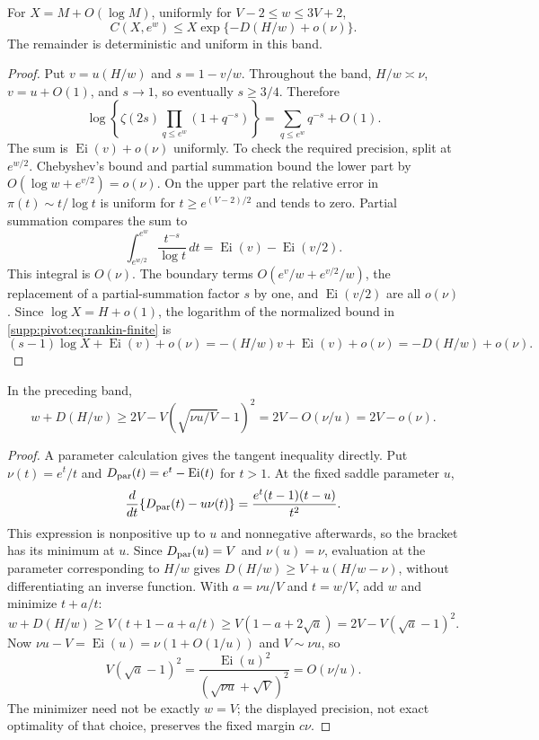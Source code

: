 \begin{lemma}\label{supp:pivot:lem:rankin}
For $X=M+O(\log M)$, uniformly for $V-2\le w\le3V+2$,
\begin{equation}\label{supp:pivot:eq:rankin}
 C(X,e^w)\le X\exp\{-D(H/w)+o(\nu)\}.
\end{equation}
The remainder is deterministic and uniform in this band.
\end{lemma}
\begin{proof}
Put $v=u(H/w)$ and $s=1-v/w$. Throughout the band,
$H/w\asymp\nu$, $v=u+O(1)$, and $s\to1$, so eventually $s\ge3/4$.
Therefore
\[
 \log\left\{\zeta(2s)\prod_{q\le e^w}(1+q^{-s})\right\}
    =\sum_{q\le e^w}q^{-s}+O(1).
\]
The sum is $\operatorname{Ei}(v)+o(\nu)$ uniformly. To check the required precision, split at $e^{w/2}$. Chebyshev's bound and partial summation bound the lower part by $O(\log w+e^{v/2})=o(\nu)$.
On the upper part the relative error in $\pi(t)\sim t/\log t$ is uniform for $t\ge e^{(V-2)/2}$ and tends to zero. Partial summation compares the sum to
\[
 \int_{e^{w/2}}^{e^w}\frac{t^{-s}}{\log t}\,dt
       =\operatorname{Ei}(v)-\operatorname{Ei}(v/2).
\]
This integral is $O(\nu)$. The boundary terms
$O(e^v/w+e^{v/2}/w)$, the replacement of a partial-summation factor $s$ by one, and $\operatorname{Ei}(v/2)$ are all $o(\nu)$.
Since $\log X=H+o(1)$, the logarithm of the normalized bound in
\eqref{supp:pivot:eq:rankin-finite} is
\[
 (s-1)\log X+\operatorname{Ei}(v)+o(\nu)
   =-(H/w)v+\operatorname{Ei}(v)+o(\nu)
   =-D(H/w)+o(\nu).
\]
\end{proof}

\begin{lemma}\label{supp:pivot:lem:saddle}
In the preceding band,
\begin{equation}\label{supp:pivot:eq:saddle}
 w+D(H/w)\ge2V-V\left(\sqrt{\nu u/V}-1\right)^2
              =2V-O(\nu/u)=2V-o(\nu).
\end{equation}
\end{lemma}
\begin{proof}
A parameter calculation gives the tangent inequality directly.
Put $\nu(t)=e^t/t$ and $D_{\rm par}(t)=e^t-\operatorname{Ei}(t)$
for $t>1$. At the fixed saddle parameter $u$,
\[
 \frac{d}{dt}\{D_{\rm par}(t)-u\nu(t)\}
       =\frac{e^t(t-1)(t-u)}{t^2}.
\]
This expression is nonpositive up to $u$ and nonnegative afterwards,
so the bracket has its minimum at $u$. Since
$D_{\rm par}(u)=V$ and $\nu(u)=\nu$, evaluation at the parameter
corresponding to $H/w$ gives
$D(H/w)\ge V+u(H/w-\nu)$, without differentiating an inverse function.
With $a=\nu u/V$ and $t=w/V$, add $w$ and minimize $t+a/t$:
\[
 w+D(H/w)\ge V(t+1-a+a/t)
                 \ge V(1-a+2\sqrt a)=2V-V(\sqrt a-1)^2.
\]
Now $\nu u-V=\operatorname{Ei}(u)=\nu(1+O(1/u))$ and $V\sim\nu u$, so
\[
 V(\sqrt a-1)^2
 =\frac{\operatorname{Ei}(u)^2}{(\sqrt{\nu u}+\sqrt V)^2}
 =O(\nu/u).
\]
The minimizer need not be exactly $w=V$; the displayed precision, not exact optimality of that choice, preserves the fixed margin $c\nu$.
\end{proof}

